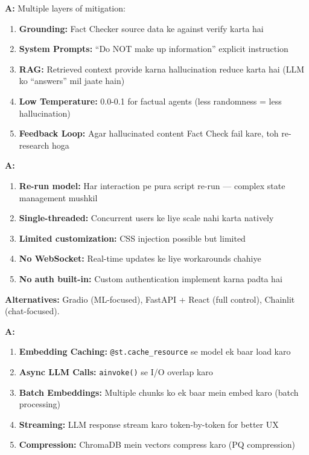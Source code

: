 \documentclass[12pt, a4paper]{article}
\begin{document}
\begin{interviewbox}[title={\faIcon{user-tie} ~Q44: Agar LLM hallucinate kare toh?}]
\textbf{A:} Multiple layers of mitigation:
\begin{enumerate}
\item \textbf{Grounding:} Fact Checker source data ke against verify karta hai
\item \textbf{System Prompts:} ``Do NOT make up information'' explicit instruction
\item \textbf{RAG:} Retrieved context provide karna hallucination reduce karta hai (LLM ko ``answers'' mil jaate hain)
\item \textbf{Low Temperature:} 0.0-0.1 for factual agents (less randomness = less hallucination)
\item \textbf{Feedback Loop:} Agar hallucinated content Fact Check fail kare, toh re-research hoga
\end{enumerate}
\end{interviewbox}

\begin{interviewbox}[title={\faIcon{user-tie} ~Q45: Streamlit ki limitations kya hain?}]
\textbf{A:}
\begin{enumerate}
\item \textbf{Re-run model:} Har interaction pe pura script re-run --- complex state management mushkil
\item \textbf{Single-threaded:} Concurrent users ke liye scale nahi karta natively
\item \textbf{Limited customization:} CSS injection possible but limited
\item \textbf{No WebSocket:} Real-time updates ke liye workarounds chahiye
\item \textbf{No auth built-in:} Custom authentication implement karna padta hai
\end{enumerate}

\textbf{Alternatives:} Gradio (ML-focused), FastAPI + React (full control), Chainlit (chat-focused).
\end{interviewbox}

\begin{interviewbox}[title={\faIcon{user-tie} ~Q46: Performance optimization tips?}]
\textbf{A:}
\begin{enumerate}
\item \textbf{Embedding Caching:} \texttt{@st.cache\_resource} se model ek baar load karo
\item \textbf{Async LLM Calls:} \texttt{ainvoke()} se I/O overlap karo
\item \textbf{Batch Embeddings:} Multiple chunks ko ek baar mein embed karo (batch processing)
\item \textbf{Streaming:} LLM response stream karo token-by-token for better UX
\item \textbf{Compression:} ChromaDB mein vectors compress karo (PQ compression)
\end{enumerate}
\end{interviewbox}
\end{document}
